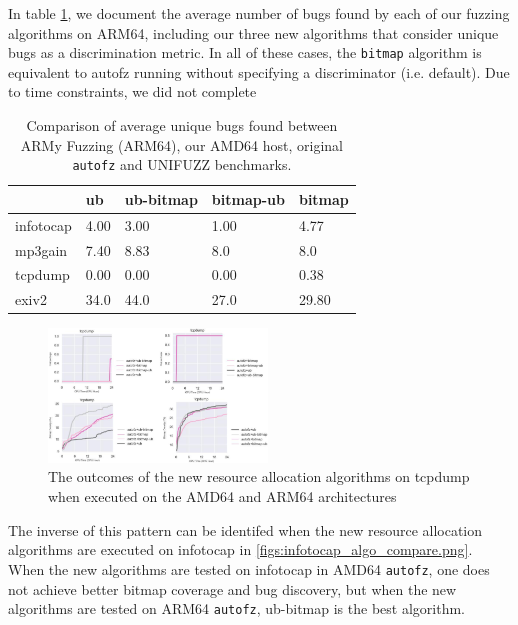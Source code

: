 In table \ref{arm64-additional-metrics}, we document the average number of bugs found by each of 
our fuzzing algorithms on ARM64, including our three new algorithms that consider unique bugs as a 
discrimination metric. In all of these cases, the \texttt{bitmap} algorithm is equivalent to autofz running without 
specifying a discriminator (i.e. default). Due to time constraints, we did not complete 

\begin{table}
    \begin{tabular}{lllll}
        \toprule
         & ub & ub-bitmap & bitmap-ub & bitmap \\
        \midrule
        infotocap & 4.00 & 3.00 & 1.00 & 4.77 \\
        mp3gain & 7.40 & 8.83 & 8.0 & 8.0 \\       
        tcpdump & 0.00 & 0.00 & 0.00 & 0.38 \\
        exiv2 & 34.0 & 44.0 & 27.0 & 29.80 \\
        \bottomrule
    \end{tabular}
    \caption{Comparison of average unique bugs found between ARMy Fuzzing (ARM64), our AMD64 
    host, original \texttt{autofz} and UNIFUZZ benchmarks.}
    \label{arm64-additional-metrics}
\end{table}

\begin{figure}
    \includegraphics[width=0.52\textwidth]{figs/tcpdump_algo_compare.png}
    \centering
    \caption{The outcomes of the new resource allocation algorithms on tcpdump when executed on the AMD64 and ARM64 architectures}
    \label{figs:tcpdump_algo_compare.png}
\end{figure}

The inverse of this pattern can be identifed when the new resource allocation algorithms are executed on infotocap in 
\ref{figs:infotocap_algo_compare.png}. When the new algorithms are tested on infotocap in AMD64 \texttt{autofz}, one does not achieve better
bitmap coverage and bug discovery, but when the new algorithms are tested on ARM64 \texttt{autofz}, ub-bitmap is the best algorithm.


